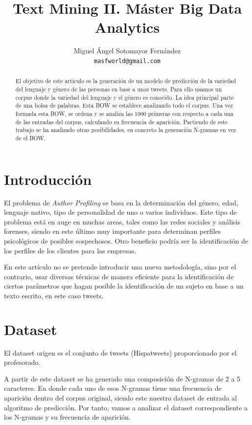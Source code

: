 \documentclass[11pt,a4paper]{article}
\title{Text Mining II. Máster Big Data Analytics}
\author{Miguel Ángel Sotomayor Fernández \\
  {\tt masfworld@gmail.com} \\}
\date{}
\begin{document}
\maketitle
\begin{abstract}
  El objetivo de este artículo es la generación de un modelo de predicción de la variedad del lenguaje y género de las personas en base a unos tweets. Para ello usamos un corpus donde la variedad del lenguaje y el género es conocido. La idea principal parte de una bolsa de palabras. Esta BOW se establece analizando todo el corpus. Una vez formada esta BOW, se ordena y se analiza las 1000 primeras con respecto a cada una de las entradas del corpus, calculando su frecuencia de aparición. Partiendo de este trabajo se ha analizado otras posibilidades, en concreto la generación N-gramas en vez de el BOW.
\end{abstract}


\section{Introducción}

El problema de \emph{Author Profiling} se basa en la determinación del género, edad, lenguaje nativo, tipo de personalidad de uno o varios individuos. Este tipo de problema está en auge en muchas areas, tales como las redes sociales y análisis forenses, siendo en este último muy importante para determinan perfiles psicológicos de posibles sospechosos. Otro beneficio podría ser la identificación de los perfiles de los clientes para las empresas.

En este artículo no se pretende introducir una nueva metodología, sino por el contrario, usar diversas técnicas de manera eficiente para la identificación de ciertos parámetros que hagan posible la identificación de un sujeto en base a un texto escrito, en este caso tweets.



\section{Dataset}

El dataset origen es el conjunto de tweets (Hispatweets) proporcionado por el profesorado.

A partir de este dataset se ha generado una composición de N-gramas de 2 a 5 caracteres. En donde cada uno de esos N-gramas tiene una frecuencia de aparición dentro del corpus original, siendo este nuestro dataset de entrada al algoritmo de predicción. Por tanto, vamos a analizar el dataset correspondiente a los N-gramas y su frecuencia de aparición.
\end{document}
